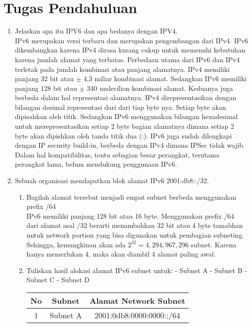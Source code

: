 \section{Tugas Pendahuluan}
\begin{enumerate}
	\item Jelaskan apa itu IPV6 dan apa bedanya dengan IPV4.\\
	IPv6 merupakan versi terbaru dan merupakan pengembangan dari IPv4. IPv6 dikembangkan karena IPv4 dirasa kurang cukup untuk memenuhi kebutuhan karena jumlah alamat yang terbatas. Perbedaan utama dari IPv6 dan IPv4 terletak pada jumlah kombinasi atau panjang alamatnya. IPv4 memiliki panjang 32 bit atau $\pm$ 4,3 miliar kombinasi alamat. Sedangkan IPv6 memiliki panjang 128 bit atau $\pm$ 340 undecilion kombinasi alamat. Keduanya juga berbeda dalam hal representasi alamatnya. IPv4 direpresentasikan dengan bilangan desimal representasi dari dari tiap byte nya. Setiap byte akan dipisahkan oleh titik. Sedangkan IPv6 menggunakan bilangan hexadesimal untuk merepresentasikan setiap 2 byte bagian alamatnya dimana setiap 2 byte akan dipishkan oleh tanda titik dua (:). IPv6 juga sudah dilengkapi dengan IP security build-in, berbeda dengan IPv4 dimana IPSec tidak wajib. Dalam hal kompatibilitas, tentu sebagian besar perangkat, terutama perangkat lama, belum mendukung penggunaan IPv6.
	\item Sebuah organisasi mendapatkan blok alamat IPv6 2001:db8::/32. 
	\begin{enumerate}
		\item Bagilah alamat tersebut menjadi empat subnet berbeda menggunakan prefix /64 \\
		IPv6 memiliki panjang 128 bit atau 16 byte. Menggunakan prefix /64 dari alamat asal /32 berarti menambahkan 32 bit atau 4 byte tamabhan untuk network portion yang bisa digunakan untuk pembagian subneting. Sehingga, kemungkinan akan ada $2^32 = 4,294,967,296$ subnet. Karena hanya memerlukan 4, maka akan diambil 4 alamat paling awal.
		\item Tuliskan hasil alokasi alamat IPv6 subnet untuk: - Subnet A - Subnet B - Subnet C - Subnet D\\
		\begin{table}[!h]
			\centering
			\begin{tabular}{|c|c|c|}
				\hline
				No & Subnet & Alamat Network Subnet \\ \hline
				1 & Subnet A & 2001:0db8:0000:0000::/64 \\ \hline

\end{tabular}
\end{table}
\end{enumerate}
\end{enumerate}
